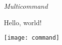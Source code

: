 \documentclass{article}
\begin{document}
\emph{Multicommand}

Hello, world!

\texttt{[image: command]}
\end{document}

